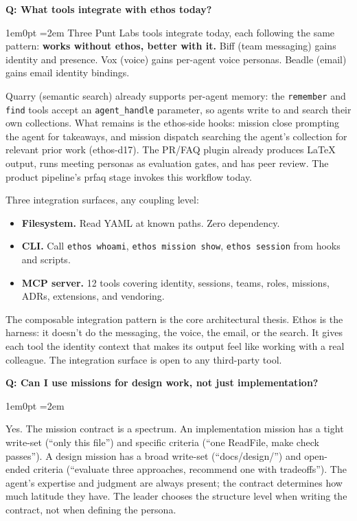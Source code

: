 \documentclass[11pt,letterpaper]{article}
\newcounter{faqnum}
\newenvironment{faqpair}[1]{%
  \needspace{4\baselineskip}%
  \vspace{0.5em}%
  \refstepcounter{faqnum}%
  \noindent\textbf{\color{SectionBlue}Q\thefaqnum: #1}\par\nopagebreak[4]%
  \vspace{0.2em}%
  \begin{adjustwidth}{1em}{0pt}%
  \setlength{\parindent}{0pt}%
  \emergencystretch=2em%
}{%
  \end{adjustwidth}%
  \vspace{0.5em}%
}
\begin{document}
\begin{faqpair}{What tools integrate with ethos today?}\label{faq:integrations}
Three Punt Labs tools integrate today, each following the same pattern: \textbf{works without ethos, better with it.} Biff (team messaging) gains identity and presence. Vox (voice) gains per-agent voice personas. Beadle (email) gains email identity bindings.

Quarry (semantic search) already supports per-agent memory: the {\small\texttt{remember}} and {\small\texttt{find}} tools accept an {\small\texttt{agent\_handle}} parameter, so agents write to and search their own collections. What remains is the ethos-side hooks: mission close prompting the agent for takeaways, and mission dispatch searching the agent's collection for relevant prior work (ethos-d17). The PR/FAQ plugin already produces LaTeX output, runs meeting personas as evaluation gates, and has peer review. The product pipeline's prfaq stage invokes this workflow today.

Three integration surfaces, any coupling level:

\begin{itemize}[nosep]
  \item \textbf{Filesystem.} Read YAML at known paths. Zero dependency.
  \item \textbf{CLI.} Call {\small\texttt{ethos whoami}}, {\small\texttt{ethos mission show}}, {\small\texttt{ethos session}} from hooks and scripts.
  \item \textbf{MCP server.} 12 tools covering identity, sessions, teams, roles, missions, ADRs, extensions, and vendoring.
\end{itemize}

The composable integration pattern is the core architectural thesis. Ethos is the harness: it doesn't do the messaging, the voice, the email, or the search. It gives each tool the identity context that makes its output feel like working with a real colleague. The integration surface is open to any third-party tool.
\end{faqpair}

\begin{faqpair}{Can I use missions for design work, not just implementation?}
Yes. The mission contract is a spectrum. An implementation mission has a tight write-set (``only this file'') and specific criteria (``one ReadFile, make check passes''). A design mission has a broad write-set (``docs/design/'') and open-ended criteria (``evaluate three approaches, recommend one with tradeoffs''). The agent's expertise and judgment are always present; the contract determines how much latitude they have. The leader chooses the structure level when writing the contract, not when defining the persona.
\end{faqpair}
\end{document}

